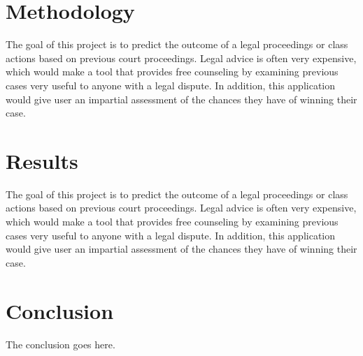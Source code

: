 \documentclass[journal]{IEEEtran}
\begin{document}
\section{Methodology}
The goal of this project is to predict the outcome of a legal proceedings or class actions based on previous court proceedings. Legal advice is often very expensive, which would make a tool that provides free counseling by examining previous cases very useful to anyone with a legal dispute. In addition, this application would give user an impartial assessment of the chances they have of winning their case.

\section{Results}
The goal of this project is to predict the outcome of a legal proceedings or class actions based on previous court proceedings. Legal advice is often very expensive, which would make a tool that provides free counseling by examining previous cases very useful to anyone with a legal dispute. In addition, this application would give user an impartial assessment of the chances they have of winning their case.

\section{Conclusion}
The conclusion goes here.
\end{document}
